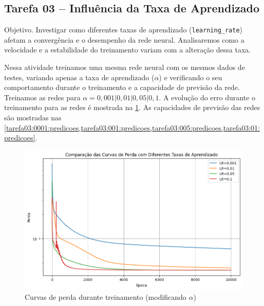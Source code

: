 \subsection{Tarefa 03 -- Influência da Taxa de Aprendizado}

\begin{comandoquestao}
Objetivo. Investigar como diferentes taxas de aprendizado 
(\texttt{learning\_rate}) afetam a 
convergência e o desempenho da rede neural. Analisaremos como a velocidade e a 
estabilidade do treinamento variam com a alteração dessa taxa.
\end{comandoquestao}

Nessa atividade treinamos uma mesma rede neural com os mesmos dados de testes, 
variando apenas a taxa de aprendizado ($\alpha$) e verificando o seu 
comportamento durante 
o treinamento e a capacidade de previsão da rede. Treinamos as redes para 
$\alpha = 0,001 | 0,01 | 0,05 | 0,1$. A evolução do erro durante o treinamento 
para as redes é mostrada na \cref{tarefa03:tabela:curvas}. As 
capacidades de previsão das redes são mostradas nas 
\cref{tarefa03:0001:predicoes,tarefa03:001:predicoes,tarefa03:005:predicoes,tarefa03:01:predicoes}.

\begin{figure}[tbh]
	\centering
	\caption{Curvas de perda durante treinamento (modificando $\alpha$)}
	\label{tarefa03:tabela:curvas}
	\includegraphics[width=0.7\linewidth]{./0803_imgs/png-241110-180530307-18269409044321663699.png}
\end{figure}


